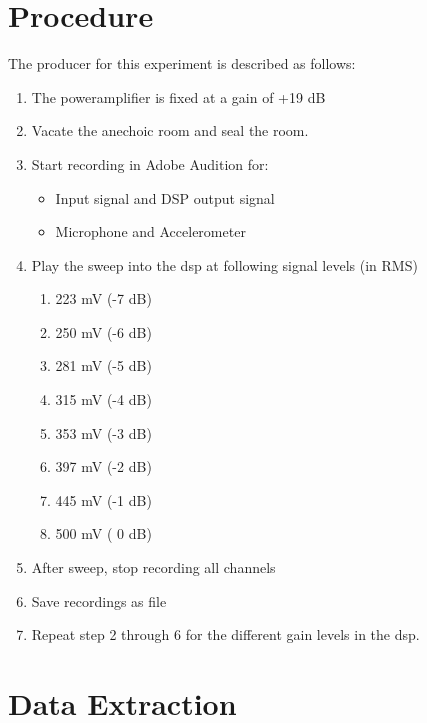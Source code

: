 \section{Procedure}\label{sec:SpeakerTestProcedure1}

The producer for this experiment is described as follows:
\vspace{-5mm}
\begin{enumerate}
\item The poweramplifier is fixed at a gain of +19 dB
\item Vacate the anechoic room and seal the room.
\item Start recording in Adobe Audition for:
\begin{itemize}
\item Input signal and DSP output signal
\item Microphone and Accelerometer
\end{itemize}
\item Play the sweep into the dsp at following signal levels (in RMS)
\begin{enumerate}
	\item 223 mV (-7 dB)
	\item 250 mV (-6 dB)
	\item 281 mV (-5 dB)
	\item 315 mV (-4 dB)
	\item 353 mV (-3 dB)
	\item 397 mV (-2 dB)
	\item 445 mV (-1 dB)
	\item 500 mV ( 0 dB) 
\end{enumerate}
\item After sweep, stop recording all channels
\item Save recordings as  file
\item Repeat step 2 through 6 for the different gain levels in the dsp.
\end{enumerate}



%


\section{Data Extraction}

